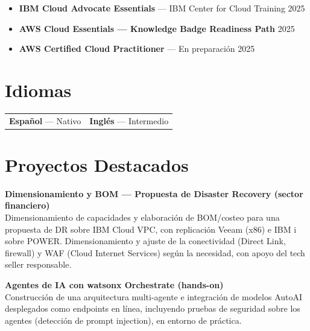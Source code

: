 \documentclass[11pt,a4paper]{article}
\begin{document}
\begin{itemize}[leftmargin=14pt, itemsep=3pt, topsep=0pt]
  \item \textbf{IBM Cloud Advocate Essentials} --- IBM Center for Cloud Training \hfill {\small\color{graytext}2025}
  \item \textbf{AWS Cloud Essentials --- Knowledge Badge Readiness Path} \hfill {\small\color{graytext}2025}
  \item \textbf{AWS Certified Cloud Practitioner} --- En preparaci\'on \hfill {\small\color{graytext}2025}
\end{itemize}

\section{\faLanguage\hspace{6pt}Idiomas}

\begin{tabularx}{\textwidth}{X X}
  \textbf{Espa\~nol} --- Nativo &
  \textbf{Ingl\'es} --- Intermedio
\end{tabularx}

\section{\faRocket\hspace{6pt}Proyectos Destacados}

\textbf{\color{darktext}Dimensionamiento y BOM --- Propuesta de Disaster Recovery (sector financiero)}\\
{\small Dimensionamiento de capacidades y elaboraci\'on de BOM/costeo para una propuesta de DR sobre IBM Cloud VPC, con replicaci\'on Veeam (x86) e IBM i sobre POWER. Dimensionamiento y ajuste de la conectividad (Direct Link, firewall) y WAF (Cloud Internet Services) seg\'un la necesidad, con apoyo del tech seller responsable.}
\vspace{5pt}

\textbf{\color{darktext}Agentes de IA con watsonx Orchestrate (hands-on)}\\
{\small Construcci\'on de una arquitectura multi-agente e integraci\'on de modelos AutoAI desplegados como endpoints en l\'inea, incluyendo pruebas de seguridad sobre los agentes (detecci\'on de prompt injection), en entorno de pr\'actica.}
\end{document}
